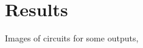 \documentclass{article}
\begin{document}
\section{Results}
Images of circuits for some outputs,
\begin{figure}[h!]
    \centering
    \label{fig:enter-label}
\end{figure}
\pagebreak
\begin{figure}[h!]
    \centering
    \label{fig:enter-label}
\end{figure}
\end{document}
